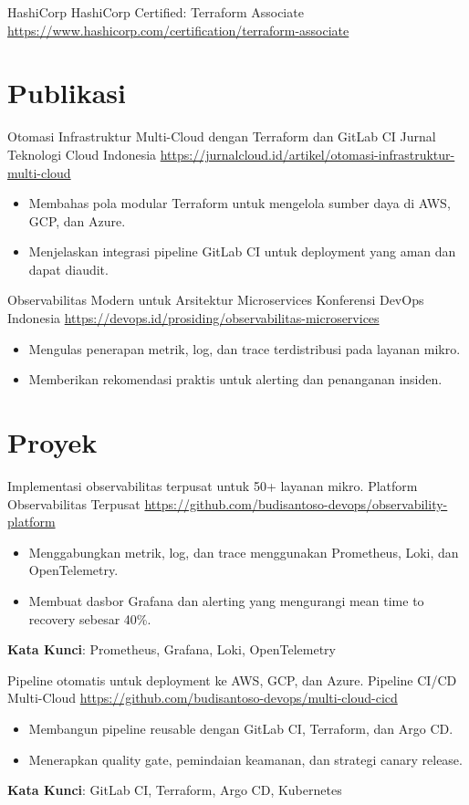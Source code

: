 \documentclass[a4paper, serif, 10pt]{moderncv}
\begin{document}
        {HashiCorp}
        {HashiCorp Certified: Terraform Associate}
        {\url{https://www.hashicorp.com/certification/terraform-associate}}
        {}
        {}
\section{Publikasi}

        {Otomasi Infrastruktur Multi-Cloud dengan Terraform dan GitLab CI}
        {Jurnal Teknologi Cloud Indonesia}
        {\url{https://jurnalcloud.id/artikel/otomasi-infrastruktur-multi-cloud}}
        {}
        {\begin{itemize}
\item Membahas pola modular Terraform untuk mengelola sumber daya di AWS, GCP, dan Azure.
\item Menjelaskan integrasi pipeline GitLab CI untuk deployment yang aman dan dapat diaudit.
\end{itemize}}

        {Observabilitas Modern untuk Arsitektur Microservices}
        {Konferensi DevOps Indonesia}
        {\url{https://devops.id/prosiding/observabilitas-microservices}}
        {}
        {\begin{itemize}
\item Mengulas penerapan metrik, log, dan trace terdistribusi pada layanan mikro.
\item Memberikan rekomendasi praktis untuk alerting dan penanganan insiden.
\end{itemize}}
\section{Proyek}

        {Implementasi observabilitas terpusat untuk 50+ layanan mikro.}
        {Platform Observabilitas Terpusat}
        {\url{https://github.com/budisantoso-devops/observability-platform}}
        {}
        {\begin{itemize}
\item Menggabungkan metrik, log, dan trace menggunakan Prometheus, Loki, dan OpenTelemetry.
\item Membuat dasbor Grafana dan alerting yang mengurangi mean time to recovery sebesar 40\%.
\end{itemize}
\textbf{Kata Kunci}: Prometheus, Grafana, Loki, OpenTelemetry}

        {Pipeline otomatis untuk deployment ke AWS, GCP, dan Azure.}
        {Pipeline CI/CD Multi-Cloud}
        {\url{https://github.com/budisantoso-devops/multi-cloud-cicd}}
        {}
        {\begin{itemize}
\item Membangun pipeline reusable dengan GitLab CI, Terraform, dan Argo CD.
\item Menerapkan quality gate, pemindaian keamanan, dan strategi canary release.
\end{itemize}
\textbf{Kata Kunci}: GitLab CI, Terraform, Argo CD, Kubernetes}
\end{document}
